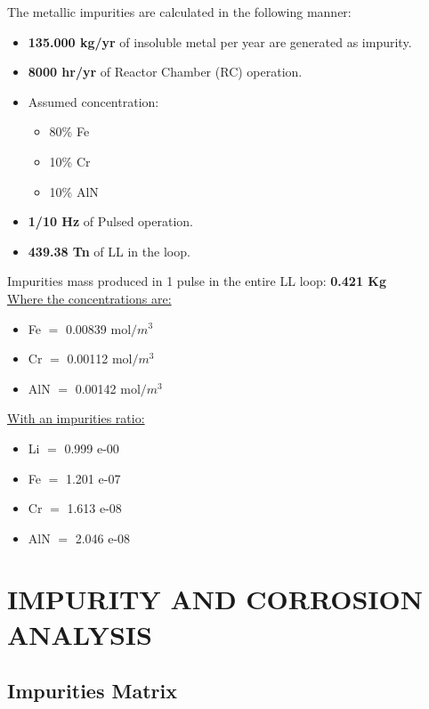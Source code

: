 \begin{tcolorbox}[colback=blue!5!white,colframe=blue!75!black,title=Inputs \& Assumptions]
	The metallic impurities are calculated in the following manner:
	\begin{itemize}
		\item \textbf{135.000 kg/yr} of insoluble metal per year are generated as impurity.
		\item \textbf{8000 hr/yr} of Reactor Chamber (RC) operation.
		\item Assumed concentration:
		\begin{itemize}
			\item 80\% Fe
			\item 10\% Cr
			\item 10\% AlN 
		\end{itemize}
		\item \textbf{1/10 Hz} of Pulsed operation.
		\item \textbf{439.38 Tn} of LL in the loop.
	\end{itemize}
	Impurities mass  produced in 1 pulse in the entire LL loop: \textbf{0.421 Kg}\\
	\underline{Where the concentrations are:}
	\begin{itemize}
		\item Fe $=$ 0.00839 $\text{mol}/m^3$
		\item Cr $=$ 0.00112 $\text{mol}/m^3$
		\item AlN $=$ 0.00142 $\text{mol}/m^3$
	\end{itemize}
	\underline{With an impurities ratio:}
	\begin{itemize}
		\item Li $=$  0.999 e-00
		\item Fe $=$ 1.201 e-07
		\item Cr $=$ 1.613 e-08
		\item AlN $=$ 2.046 e-08
	\end{itemize}
\end{tcolorbox}



\newpage
\section{IMPURITY AND CORROSION ANALYSIS} \label{sec:impurity}%
\subsection{Impurities Matrix}

